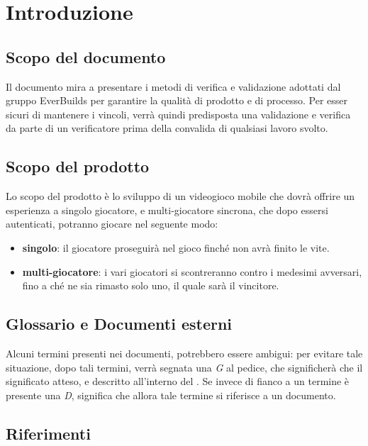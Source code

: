 \section{Introduzione}
	\subsection{Scopo del documento}
		Il documento mira a presentare i metodi di verifica e validazione adottati dal gruppo EverBuilds per garantire la qualità di prodotto e di processo. 
		Per esser sicuri di mantenere i vincoli, verrà quindi predisposta una validazione e verifica da parte di un verificatore prima della convalida di qualsiasi lavoro svolto.
	\subsection{Scopo del prodotto}
		Lo scopo del prodotto è lo sviluppo di un videogioco mobile che dovrà offrire un esperienza a singolo giocatore, e multi-giocatore sincrona, che dopo essersi autenticati, potranno giocare nel seguente modo:
		\begin{itemize}
			\item \textbf{singolo}:
				il giocatore proseguirà nel gioco finché non avrà finito le vite.
			\item \textbf{multi-giocatore}:
				i vari giocatori si scontreranno contro i medesimi avversari, fino a ché ne sia rimasto solo uno, il quale sarà il vincitore.
		\end{itemize}
		
		
		
	\subsection{Glossario e Documenti esterni}
		Alcuni termini presenti nei documenti, potrebbero essere ambigui: per evitare tale situazione, dopo tali termini, verrà segnata una \textit{G} al pedice, che significherà che il significato atteso, e descritto all'interno del .
		Se invece di fianco a un termine è presente una  \textit{D}, significa che allora tale termine si riferisce a un documento.
		
	\subsection{Riferimenti}
